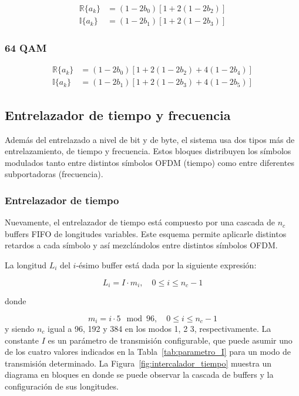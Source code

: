 	\begin{align}
		\mathbb{R}\{a_k\} &= (1 - 2 b_0)\left[1 + 2(1 - 2 b_2)\right] \\
		\mathbb{I}\{a_k\} &= (1 - 2 b_1)\left[1 + 2(1 - 2 b_3)\right]
	\end{align}



	\subsubsection{64 QAM}
	\begin{align}
		\mathbb{R}\{a_k\} &= (1 - 2 b_0) \left[ 1 + 2(1 - 2 b_2) + 4(1 - 2 b_4) \right] \\
		\mathbb{I}\{a_k\} &= (1 - 2 b_1) \left[ 1 + 2(1 - 2 b_3) + 4(1 - 2 b_5) \right]
	\end{align}

	\subsection{Entrelazador de tiempo y frecuencia}

	Además del entrelazado a nivel de bit y de byte, el sistema usa dos tipos más de entrelazamiento, de tiempo y frecuencia. Estos bloques distribuyen los símbolos modulados tanto entre distintos símbolos OFDM (tiempo) como entre diferentes subportadoras (frecuencia).

	\subsubsection{Entrelazador de tiempo}

	Nuevamente, el entrelazador de tiempo está compuesto por una cascada de $n_c$ buffers FIFO de longitudes variables. Este esquema permite aplicarle distintos retardos a cada símbolo y así mezclándolos entre distintos símbolos OFDM.

	La longitud $L_i$ del $i$-ésimo buffer está dada por la siguiente expresión:

	\begin{equation}
		L_i = I \cdot m_i, \quad 0 \leq i \leq n_c - 1
	\end{equation}

	donde

	\begin{equation}
		m_i = i \cdot 5 \mod 96, \quad 0 \leq i \leq n_c - 1
	\end{equation}
	y siendo $n_c$ igual a 96, 192 y 384 en los modos 1, 2 3, respectivamente. La constante $I$ es un parámetro de transmisión configurable, que puede asumir uno de los cuatro valores indicados en la Tabla~\ref{tab:parametro_I} para un modo de transmisión determinado. La Figura~\ref{fig:intercalador_tiempo} muestra un diagrama en bloques en donde se puede observar la cascada de buffers y la configuración de sus longitudes.


